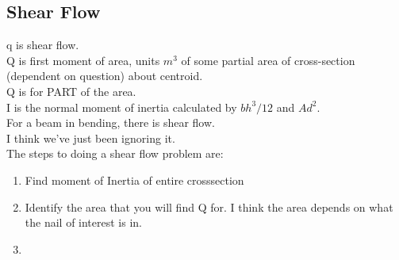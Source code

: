 \documentclass{article}
\numberwithin{equation}{subsection}
\begin{document}
\subsection{Shear Flow}

q is shear flow. \\
Q is first moment of area, units $m^3$ of some partial area of cross-section (dependent on question) about centroid. \\
Q is for PART of the area. \\
I is the normal moment of inertia calculated by $bh^3/12$ and $Ad^2$. \\

For a beam in bending, there is shear flow. \\

I think we've just been ignoring it. \\

The steps to doing a shear flow problem are:
\begin{enumerate}
  \item Find moment of Inertia of entire crosssection
  \item Identify the area that you will find Q for. I think the area depends on what the nail of interest is in.
  \item 
\end{enumerate}
\end{document}
